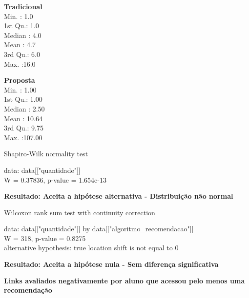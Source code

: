 \begin{multicols}{2}

\noindent\textbf{Tradicional}\\
Min.   : 1.0\\
1st Qu.: 1.0\\
Median : 4.0\\
Mean   : 4.7\\
3rd Qu.: 6.0\\
Max.   :16.0\\

\columnbreak

\noindent\textbf{Proposta}\\
Min.   :  1.00\\
1st Qu.:  1.00\\
Median :  2.50\\
Mean   : 10.64\\
3rd Qu.:  9.75\\
Max.   :107.00
\end{multicols}

  Shapiro-Wilk normality test

\noindent
data:  data[["quantidade"]]\\
W = 0.37836, p-value = 1.654e-13

\textbf{Resultado: Aceita a hipótese alternativa - Distribuição não normal}

Wilcoxon rank sum test with continuity correction

\noindent
data:  data[["quantidade"]] by data[["algoritmo\_recomendacao"]]\\
W = 318, p-value = 0.8275\\
alternative hypothesis: true location shift is not equal to 0

\textbf{Resultado: Aceita a hipótese nula - Sem diferença significativa}

\textbf{Links avaliados negativamente por aluno que acessou pelo menos uma recomendação}


